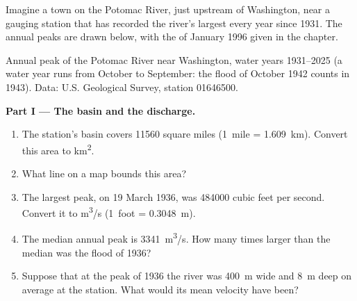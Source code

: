 \begin{problem}
\label{pb:g10:drainage-basins:1}
Imagine a town on the Potomac River, just upstream of Washington, near a
gauging station that has recorded the river's largest  every year
since 1931. The annual peaks are drawn below, with the  of
January 1996 given in the chapter.

\begin{center}

{\small Annual peak  of the Potomac River near Washington, water
years 1931--2025 (a water year runs from October to September: the flood of
October 1942 counts in 1943). Data: U.S. Geological Survey, station 01646500.}
\end{center}

\medskip
\noindent\textbf{Part I --- The basin and the discharge.}
\begin{enumerate}
  \item The station's basin covers \num{11560} square miles
        (\num{1}~mile = \qty{1.609}{km}). Convert this area to
        \unit{km^2}.
  \item What line on a map bounds this area?
  \item The largest peak, on 19 March 1936, was \num{484000} cubic feet per
        second. Convert it to \unit{m^3/s} (\num{1}~foot =
        \qty{0.3048}{m}).
  \item The median annual peak is \qty{3341}{m^3/s}. How many times larger
        than the median was the flood of 1936?
  \item Suppose that at the peak of 1936 the river was \qty{400}{m} wide and
        \qty{8}{m} deep on average at the station. What would its mean
        velocity have been?
\end{enumerate}


\end{problem}
